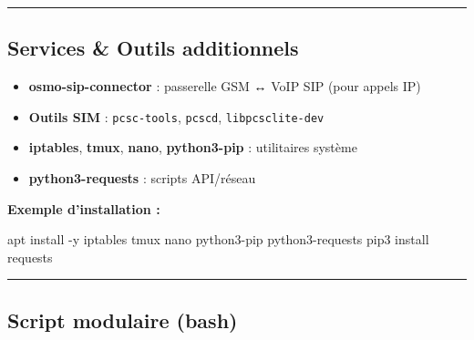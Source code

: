 \documentclass[
  french,
]{article}
\newenvironment{Shaded}{\begin{snugshade}}{\end{snugshade}}
\newcommand{\AttributeTok}[1]{\textcolor[rgb]{0.13,0.29,0.53}{#1}}
\newcommand{\ExtensionTok}[1]{#1}
\newcommand{\NormalTok}[1]{#1}
\providecommand{\tightlist}{%
  \setlength{\itemsep}{0pt}\setlength{\parskip}{0pt}}
\begin{document}
\begin{center}\rule{0.5\linewidth}{0.5pt}\end{center}

\subsection{Services \& Outils
additionnels}\label{services-outils-additionnels}

\begin{itemize}
\tightlist
\item
  \textbf{osmo-sip-connector} : passerelle GSM ↔ VoIP SIP (pour appels
  IP)
\item
  \textbf{Outils SIM} : \texttt{pcsc-tools}, \texttt{pcscd},
  \texttt{libpcsclite-dev}
\item
  \textbf{iptables}, \textbf{tmux}, \textbf{nano}, \textbf{python3-pip}
  : utilitaires système
\item
  \textbf{python3-requests} : scripts API/réseau
\end{itemize}

\textbf{Exemple d'installation :}

\begin{Shaded}
\begin{Highlighting}[]
\ExtensionTok{apt}\NormalTok{ install }\AttributeTok{{-}y}\NormalTok{ iptables tmux nano python3{-}pip python3{-}requests}
\ExtensionTok{pip3}\NormalTok{ install requests}
\end{Highlighting}
\end{Shaded}

\begin{center}\rule{0.5\linewidth}{0.5pt}\end{center}

\subsection{Script modulaire (bash)}\label{script-modulaire-bash}
\end{document}
